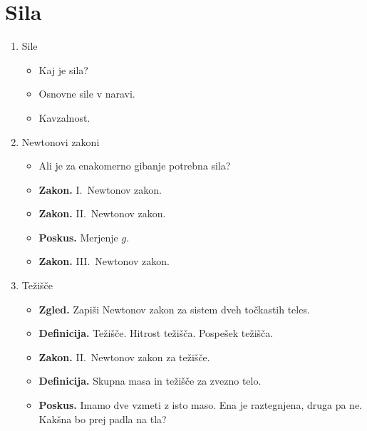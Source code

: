 \section{Sila}
\begin{enumerate}
    \item Sile
    \begin{itemize}
        \item Kaj je sila? 
        \item Osnovne sile v naravi.
        \item Kavzalnost.
    \end{itemize}

    \item Newtonovi zakoni
    \begin{itemize}
        \item Ali je za enakomerno gibanje potrebna sila?
        \item \textbf{Zakon.} I.\ Newtonov zakon.
        \item \textbf{Zakon.} II.\ Newtonov zakon.
        \item \textbf{Poskus.} Merjenje \(g\).
        \item \textbf{Zakon.} III.\ Newtonov zakon.
    \end{itemize}

    \item Težišče
    \begin{itemize}
        \item \textbf{Zgled.} Zapiši Newtonov zakon za sistem dveh točkastih teles.
        \item \textbf{Definicija.} Težišče. Hitrost težišča. Pospešek težišča.
        \item \textbf{Zakon.} II.\ Newtonov zakon za težišče.
        \item \textbf{Definicija.} Skupna masa in težišče za zvezno telo.
        \item \textbf{Poskus.} Imamo dve vzmeti z isto maso. Ena je raztegnjena, druga pa ne. Kakšna bo prej padla na tla?
    \end{itemize}
\end{enumerate}